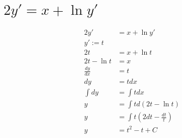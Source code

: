 

\cfoot{}

\usepackage{hyperref}

\hypersetup{
    colorlinks=true,
    linkcolor=black,
    filecolor=magenta,      
    urlcolor=cyan,
}



\section{$2y'=x+\ln y'$}


\begin{align*}
    2y'           & = x+\ln y'                               \\
    y' := t                                                  \\
    2t            & = x + \ln t                              \\
    2t - \ln t    & = x                                      \\
    \frac{dy}{dx} & = t                                      \\
    dy            & = t dx                                   \\
    \int dy       & = \int t dx                              \\
    y             & = \int t d(2t - \ln t)                   \\
    y             & = \int t \left(2dt - \frac{dt}{t}\right) \\
    y             & = t^2 - t + C                            \\
\end{align*}

